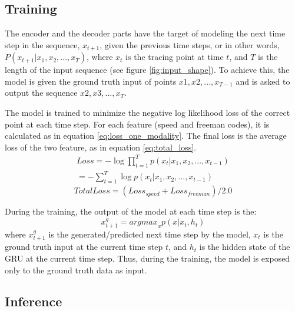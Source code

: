 \documentclass[conference]{IEEEtran}
\begin{document}
\subsection{Training}
\par The encoder and the decoder parts have the target of modeling the next time step in the sequence, $x_{t+1}$, given the previous time steps, or in other words, $P(x_{t+1}|x_1, x_2,...,x_{T})$, where $x_t$ is the tracing point at time $t$, and $T$ is the length of the input sequence (see figure \ref{fig:input_shape}).  To achieve this, the model is given the ground truth input of points $x1, x2,..., x_{T-1}$ and is asked to output the sequence $x2, x3,..., x_{T}$.

\par The model is trained to minimize the negative log likelihood loss of the correct point at each time step. For each feature (speed and freeman codes), it is calculated as in equation \ref{eq:loss_one_modality}. The final loss is the average loss of the two feature, as in equation \ref{eq:total_loss}.
\begin{equation}
    \begin{split}
    Loss = - \log \prod_{t=1}^{T} p(x_{t}|x_1, x_2,...,x_{t-1}) \\
    = - \sum_{t=1}^{T} \log p(x_{t}|x_1, x_2,...,x_{t-1})
    \label{eq:loss_one_modality}
    \end{split}
\end{equation}
\begin{equation}
    Total Loss = (Loss_{speed} + Loss_{freeman}) / 2.0
    \label{eq:total_loss}
\end{equation}

\par During the training, the output of the model at each time step is the:
\begin{equation}
    x^{g}_{t+1} = {argmax}_{x}p(x|x_{t},h_{t})
\end{equation}
where $x^{g}_{t+1}$ is the generated/predicted next time step by the model, $x_{t}$ is the ground truth input at the current time step $t$, and $h_{t}$ is the hidden state of the GRU at the current time step. Thus, during the training, the model is exposed only to the ground truth data as input.

\subsection{Inference}
\end{document}
